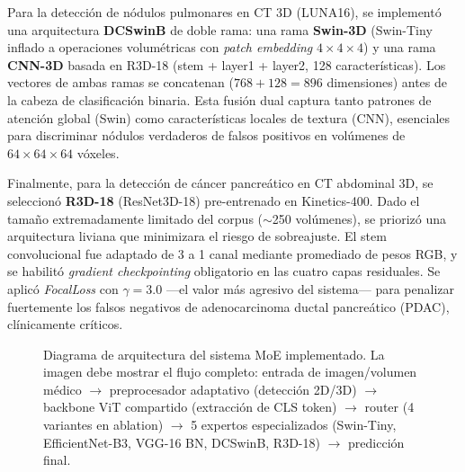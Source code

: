 \documentclass[conference, 11pt]{IEEEtran}
\begin{document}
Para la detección de nódulos pulmonares en CT 3D (LUNA16), se implementó una arquitectura \textbf{DCSwinB} de doble rama: una rama \textbf{Swin-3D} (Swin-Tiny inflado a operaciones volumétricas con \textit{patch embedding} $4 \times 4 \times 4$) y una rama \textbf{CNN-3D} basada en R3D-18 (stem + layer1 + layer2, 128 características). Los vectores de ambas ramas se concatenan ($768 + 128 = 896$ dimensiones) antes de la cabeza de clasificación binaria. Esta fusión dual captura tanto patrones de atención global (Swin) como características locales de textura (CNN), esenciales para discriminar nódulos verdaderos de falsos positivos en volúmenes de $64 \times 64 \times 64$ vóxeles.

Finalmente, para la detección de cáncer pancreático en CT abdominal 3D, se seleccionó \textbf{R3D-18} (ResNet3D-18) pre-entrenado en Kinetics-400. Dado el tamaño extremadamente limitado del corpus ($\sim$250 volúmenes), se priorizó una arquitectura liviana que minimizara el riesgo de sobreajuste. El stem convolucional fue adaptado de 3 a 1 canal mediante promediado de pesos RGB, y se habilitó \textit{gradient checkpointing} obligatorio en las cuatro capas residuales. Se aplicó \textit{FocalLoss} con $\gamma=3.0$ ---el valor más agresivo del sistema--- para penalizar fuertemente los falsos negativos de adenocarcinoma ductal pancreático (PDAC), clínicamente críticos.

\begin{figure}[H]
    \centering
    \caption{Diagrama de arquitectura del sistema MoE implementado. La imagen debe mostrar el flujo completo: entrada de imagen/volumen médico $\rightarrow$ preprocesador adaptativo (detección 2D/3D) $\rightarrow$ backbone ViT compartido (extracción de CLS token) $\rightarrow$ router (4 variantes en ablation) $\rightarrow$ 5 expertos especializados (Swin-Tiny, EfficientNet-B3, VGG-16 BN, DCSwinB, R3D-18) $\rightarrow$ predicción final.}
    \label{fig:architecture}
\end{figure}
\end{document}
